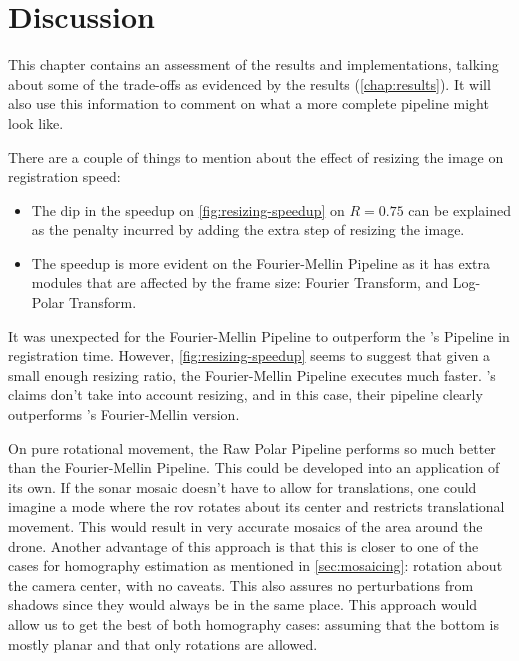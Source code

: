 \chapter{Discussion}
\label{chap:discussion}

This chapter contains an assessment of the results and implementations, talking about some of the trade-offs as evidenced by the results (\autoref{chap:results}). It will also use this information to comment on what a more complete pipeline might look like. 

There are a couple of things to mention about the effect of resizing the image on registration speed:
\begin{itemize}
    \item The dip in the speedup on \autoref{fig:resizing-speedup} on \(R=0.75\) can be explained as the penalty incurred by adding the extra step of resizing the image.
    \item The speedup is more evident on the Fourier-Mellin Pipeline as it has extra modules that are affected by the frame size: Fourier Transform, and Log-Polar Transform. 
\end{itemize}

It was unexpected for the Fourier-Mellin Pipeline to outperform the \citeauthor{Hurtos2015}'s Pipeline in registration time. However, \autoref{fig:resizing-speedup} seems to suggest that given a small enough resizing ratio, the Fourier-Mellin Pipeline executes much faster. \citeauthor{Hurtos2015}'s claims don't take into account resizing, and in this case, their pipeline clearly outperforms \citeauthor{Reddy1996}'s Fourier-Mellin version.

On pure rotational movement, the Raw Polar Pipeline performs so much better than the Fourier-Mellin Pipeline. This could be developed into an application of its own. If the sonar mosaic doesn't have to allow for translations, one could imagine a mode where the \acrshort{rov} rotates about its center and restricts translational movement. This would result in very accurate mosaics of the area around the drone. Another advantage of this approach is that this is closer to one of the cases for homography estimation as mentioned in \autoref{sec:mosaicing}: rotation about the camera center, with no caveats. This also assures no perturbations from shadows since they would always be in the same place. This approach would allow us to get the best of both homography cases: assuming that the bottom is mostly planar and that only rotations are allowed.

